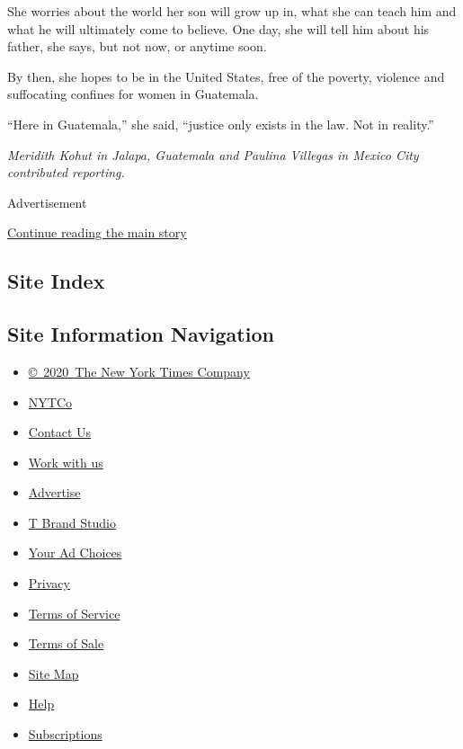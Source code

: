 She worries about the world her son will grow up in, what she can teach
him and what he will ultimately come to believe. One day, she will tell
him about his father, she says, but not now, or anytime soon.

By then, she hopes to be in the United States, free of the poverty,
violence and suffocating confines for women in Guatemala.

``Here in Guatemala,'' she said, ``justice only exists in the law. Not
in reality.''

\emph{Meridith Kohut in Jalapa, Guatemala and Paulina Villegas in Mexico
City contributed reporting.}

Advertisement

\protect\hyperlink{after-bottom}{Continue reading the main story}

\hypertarget{site-index}{%
\subsection{Site Index}\label{site-index}}

\hypertarget{site-information-navigation}{%
\subsection{Site Information
Navigation}\label{site-information-navigation}}

\begin{itemize}
\tightlist
\item
  \href{https://help.nytimes.com/hc/en-us/articles/115014792127-Copyright-notice}{©~2020~The
  New York Times Company}
\end{itemize}

\begin{itemize}
\tightlist
\item
  \href{https://www.nytco.com/}{NYTCo}
\item
  \href{https://help.nytimes.com/hc/en-us/articles/115015385887-Contact-Us}{Contact
  Us}
\item
  \href{https://www.nytco.com/careers/}{Work with us}
\item
  \href{https://nytmediakit.com/}{Advertise}
\item
  \href{http://www.tbrandstudio.com/}{T Brand Studio}
\item
  \href{https://www.nytimes.com/privacy/cookie-policy\#how-do-i-manage-trackers}{Your
  Ad Choices}
\item
  \href{https://www.nytimes.com/privacy}{Privacy}
\item
  \href{https://help.nytimes.com/hc/en-us/articles/115014893428-Terms-of-service}{Terms
  of Service}
\item
  \href{https://help.nytimes.com/hc/en-us/articles/115014893968-Terms-of-sale}{Terms
  of Sale}
\item
  \href{https://spiderbites.nytimes.com}{Site Map}
\item
  \href{https://help.nytimes.com/hc/en-us}{Help}
\item
  \href{https://www.nytimes.com/subscription?campaignId=37WXW}{Subscriptions}
\end{itemize}
